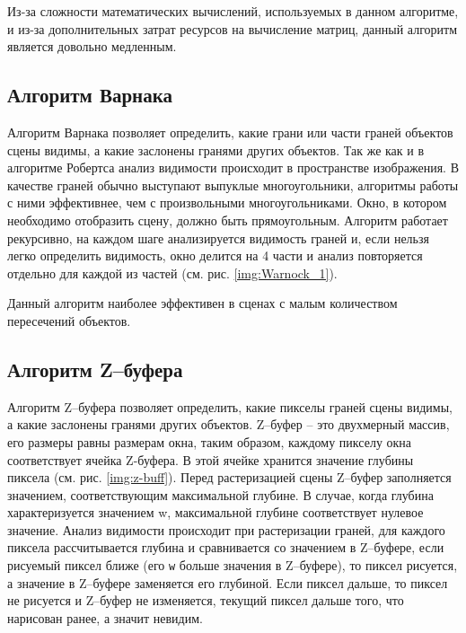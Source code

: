             Из-за сложности математических вычислений, используемых в данном алгоритме, и из-за дополнительных затрат ресурсов на вычисление матриц, данный алгоритм является довольно медленным.
        
        \subsection{Алгоритм Варнака}
        
            Алгоритм Варнака \cite{rogers,shykin,bayackovskiy} позволяет определить, какие грани или части граней объектов сцены видимы, а какие заслонены гранями других объектов. Так же как и в алгоритме Робертса анализ видимости происходит в пространстве изображения. В качестве граней обычно выступают выпуклые многоугольники, алгоритмы работы с ними эффективнее, чем с произвольными многоугольниками. Окно, в котором необходимо отобразить сцену, должно быть прямоугольным. Алгоритм работает рекурсивно, на каждом шаге анализируется видимость граней и, если нельзя легко определить видимость, окно делится на 4 части и анализ повторяется отдельно для каждой из частей (см. рис. \ref{img:Warnock_1}).
            
            
            Данный алгоритм наиболее эффективен в сценах с малым количеством пересечений объектов.

        \subsection{Алгоритм Z--буфера}
        
            Алгоритм Z--буфера \cite{rogers,shykin} позволяет определить, какие пикселы граней сцены видимы, а какие заслонены гранями других объектов. Z--буфер -- это двухмерный массив, его размеры равны размерам окна, таким образом, каждому пикселу окна соответствует ячейка Z-буфера. В этой ячейке хранится значение глубины пиксела (см. рис. \ref{img:z-buff}). Перед растеризацией сцены Z--буфер заполняется значением, соответствующим максимальной глубине. В случае, когда глубина характеризуется значением w, максимальной глубине соответствует нулевое значение. Анализ видимости происходит при растеризации граней, для каждого пиксела рассчитывается глубина и сравнивается со значением в Z--буфере, если рисуемый пиксел ближе (его \texttt{w} больше значения в Z--буфере), то пиксел рисуется, а значение в Z--буфере заменяется его глубиной. Если пиксел дальше, то пиксел не рисуется и Z--буфер не изменяется, текущий пиксел дальше того, что нарисован ранее, а значит невидим. 
            
